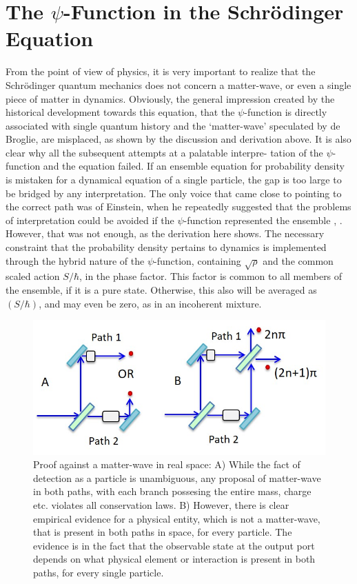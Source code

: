 \section{The $\psi$-Function in the Schr\"{o}dinger\\ Equation}\label{c14-sec3}

From the point of view of physics, it is very important to realize that the Schr\"{o}dinger
quantum mechanics does not concern a matter-wave, or even a single piece of matter in
dynamics. Obviously, the general impression created by the historical development towards
this equation, that the $\psi$-function is directly associated with single quantum history and
the `matter-wave' speculated by de Broglie, are misplaced, as shown by the discussion and
derivation above. It is also clear why all the subsequent attempts at a palatable interpre-
tation of the $\psi$-function and the equation failed. If an ensemble equation for probability
density is mistaken for a dynamical equation of a single particle, the gap is too large to be
bridged by any interpretation. The only voice that came close to pointing to the correct path
was of Einstein, when he repeatedly suggested that the problems of interpretation could be
avoided if the $\psi$-function represented the ensemble \cite{chap14-key3}, \cite{chap14-key4}. However, that was not enough, as
the derivation here shows. The necessary constraint that the probability density pertains to
dynamics is implemented through the hybrid nature of the $\psi$-function, containing $\sqrt{\rho}$ and
the common scaled action $S/\hbar$, in the phase factor. This factor is common to all members
of the ensemble, if it is a pure state. Otherwise, this also will be averaged as $(S/\hbar)$, and
may even be zero, as in an incoherent mixture.

\begin{figure}[t]
\centering
\includegraphics[scale=0.8]{src/images/chap27/1.jpg}
\caption{Proof against a matter-wave in real space: A) While the fact of detection as a particle is
unambiguous, any proposal of matter-wave in both paths, with each branch possesing the entire
mass, charge etc. violates all conservation laws. B) However, there is clear empirical evidence for
a physical entity, which is not a matter-wave, that is present in both paths in space, for every
particle. The evidence is in the fact that the observable state at the output port depends on what
physical element or interaction is present in both paths, for every single particle.}\label{ch14-fig1}
\end{figure}

